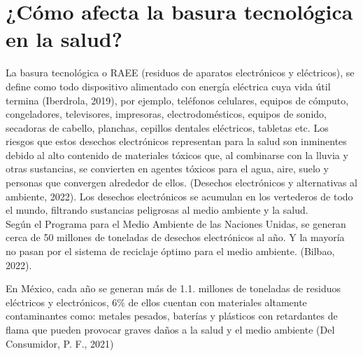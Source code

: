 \documentclass[letterpaper,12pt]{article}
\begin{document}
\begin{sloppypar}
\section{¿Cómo afecta la basura tecnológica en la salud?}
La basura tecnológica o RAEE (residuos de aparatos electrónicos y eléctricos), se define como todo dispositivo alimentado con energía eléctrica cuya vida útil termina (Iberdrola, 2019), por ejemplo, teléfonos celulares, equipos de cómputo, congeladores, televisores, impresoras, electrodomésticos, equipos de sonido, secadoras de cabello, planchas, cepillos dentales eléctricos, tabletas etc. Los riesgos que estos desechos electrónicos representan para la salud son inminentes debido al alto contenido de materiales tóxicos que, al combinarse con la lluvia y otras sustancias, se convierten en agentes tóxicos para el agua, aire, suelo y personas que convergen alrededor de ellos. (Desechos electrónicos y alternativas al ambiente, 2022). Los desechos electrónicos se acumulan en los vertederos de todo el mundo, filtrando sustancias peligrosas al medio ambiente y la salud.
\vspace{0.3cm}\\ 
Según el Programa para el Medio Ambiente de las Naciones Unidas, se generan cerca de 50 millones de toneladas de desechos electrónicos al año. Y la mayoría no pasan por el sistema de reciclaje óptimo para el medio ambiente. (Bilbao, 2022). 

En México, cada año se generan más de 1.1. millones de toneladas de residuos eléctricos y electrónicos, 6\% de ellos cuentan con materiales altamente contaminantes como: metales pesados, baterías y plásticos con retardantes de flama que pueden provocar graves daños a la salud y el medio ambiente (Del Consumidor, P. F., 2021)


\end{sloppypar}
\end{document}

